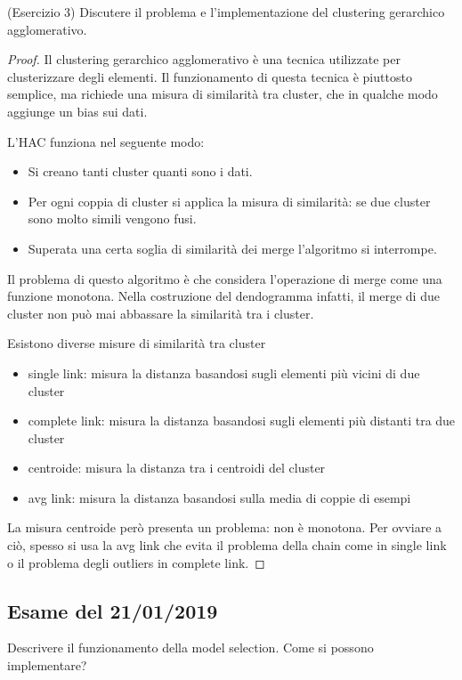 \documentclass[12pt,a4paper,oneside]{book}
\begin{document}
\begin{exercise}{(Esercizio 3)}
	Discutere il problema e l’implementazione del clustering gerarchico agglomerativo.
\end{exercise}

\begin{proof}
	Il clustering gerarchico agglomerativo è una tecnica utilizzate per clusterizzare degli elementi. Il funzionamento di questa tecnica è piuttosto semplice, ma richiede una misura di similarità tra cluster, che in qualche modo aggiunge un bias sui dati.
	
	L'HAC funziona nel seguente modo:
	\begin{itemize}
		\item Si creano tanti cluster quanti sono i dati.
		\item Per ogni coppia di cluster si applica la misura di similarità: se due cluster sono molto simili vengono fusi.
		\item Superata una certa soglia di similarità dei merge l'algoritmo si interrompe.
	\end{itemize}
	Il problema di questo algoritmo è che considera l'operazione di merge come una funzione monotona. Nella costruzione del dendogramma infatti, il merge di due cluster non può mai abbassare la similarità tra i cluster.
	
	Esistono diverse misure di similarità tra cluster
	\begin{itemize}
		\item single link: misura la distanza basandosi sugli elementi più vicini di due cluster
		\item complete link: misura la distanza basandosi sugli elementi più distanti tra due cluster
		\item centroide: misura la distanza tra i centroidi del cluster
		\item avg link: misura la distanza basandosi sulla media di coppie di esempi
	\end{itemize}
	La misura centroide però presenta un problema: non è monotona. Per ovviare a ciò, spesso si usa la avg link che evita il problema della chain come in single link o il problema degli outliers in complete link.
\end{proof}
 
\subsection{Esame del 21/01/2019}

\begin{exercise}
	Descrivere il funzionamento della model selection. Come si possono implementare?
\end{exercise}
\end{document}
